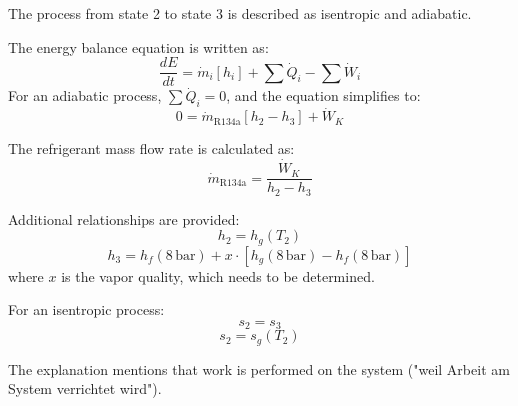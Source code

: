 The process from state 2 to state 3 is described as isentropic and adiabatic.  

The energy balance equation is written as:  
\[
\frac{dE}{dt} = \dot{m}_i [h_i] + \sum \dot{Q}_i - \sum \dot{W}_i
\]  
For an adiabatic process, \(\sum \dot{Q}_i = 0\), and the equation simplifies to:  
\[
0 = \dot{m}_{\text{R134a}} [h_2 - h_3] + \dot{W}_K
\]  

The refrigerant mass flow rate is calculated as:  
\[
\dot{m}_{\text{R134a}} = \frac{\dot{W}_K}{h_2 - h_3}
\]  

Additional relationships are provided:  
\[
h_2 = h_g(T_2)
\]  
\[
h_3 = h_f(8 \, \text{bar}) + x \cdot [h_g(8 \, \text{bar}) - h_f(8 \, \text{bar})]
\]  
where \(x\) is the vapor quality, which needs to be determined.  

For an isentropic process:  
\[
s_2 = s_3
\]  
\[
s_2 = s_g(T_2)
\]  

The explanation mentions that work is performed on the system ("weil Arbeit am System verrichtet wird").